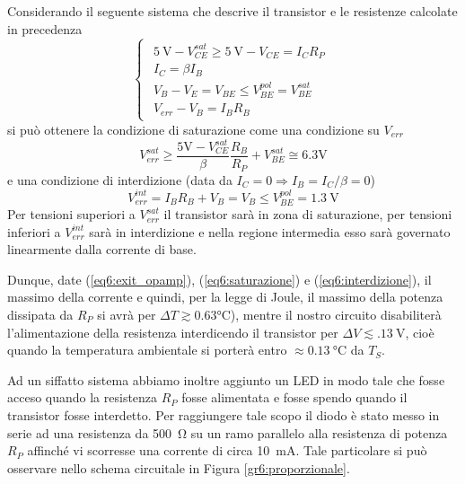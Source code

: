Considerando il seguente sistema che descrive il transistor e le resistenze calcolate in precedenza
$$
\begin{cases}
\begin{array}{rl}
\SI{5}{\volt}-V_{CE}^{sat} \geq \SI{5}{\volt}-V_{CE} = I_{C}R_P\\
I_C=\beta I_B \\
V_B - V_E = V_{BE} \leq V_{BE}^{pol} = V_{BE}^{sat}\\
V_{err}-V_B=I_B R_B
\end{array}
\end{cases}
$$
si può ottenere la condizione di saturazione come una condizione su $V_{err}$
\begin{equation}
V_{err}^{sat} \geq \frac{5\si{\volt}-V_{CE}^{sat}}{\beta} \frac{R_B}{R_P}+V_{BE}^{sat} \cong 6.3 \si{\volt}
\label{eq6:saturazione}
\end{equation}
e una condizione di interdizione (data da $I_C = 0 \Rightarrow I_B = I_C / \beta = 0$)
\begin{equation}
V_{err}^{int} = I_B R_B + V_B = V_B \leq V_{BE}^{pol} = \SI{1.3}{\V}
\label{eq6:interdizione}
\end{equation}
Per tensioni superiori a $V_{err}^{sat}$ il transistor sarà in zona di saturazione, per tensioni inferiori a $V_{err}^{int}$ sarà in interdizione e nella regione intermedia esso sarà governato linearmente dalla corrente di base.

Dunque, date (\ref{eq6:exit_opamp}), (\ref{eq6:saturazione}) e (\ref{eq6:interdizione}), il massimo della corrente e quindi, per la legge di Joule, il massimo della potenza dissipata da $R_P$ si avrà per $\Delta T \gtrsim 0.63 \si{\celsius}$), mentre il nostro circuito disabiliterà l'alimentazione della resistenza interdicendo il transistor per $\Delta V \lesssim \SI{.13}{\V}$, cioè quando la temperatura ambientale si porterà entro $\approx \SI{0.13}{\celsius}$ da $T_{S}$.


Ad un siffatto sistema abbiamo inoltre aggiunto un LED in modo tale che fosse acceso quando la resistenza $R_P$ fosse alimentata e fosse spendo quando il transistor fosse interdetto.
Per raggiungere tale scopo il diodo è stato messo in serie ad una resistenza da \SI{500}{\ohm} su un ramo parallelo alla resistenza di potenza $R_P$ affinché vi scorresse una corrente di circa \SI{10}{\mA}.
Tale particolare si può osservare nello schema circuitale in Figura \ref{gr6:proporzionale}.

